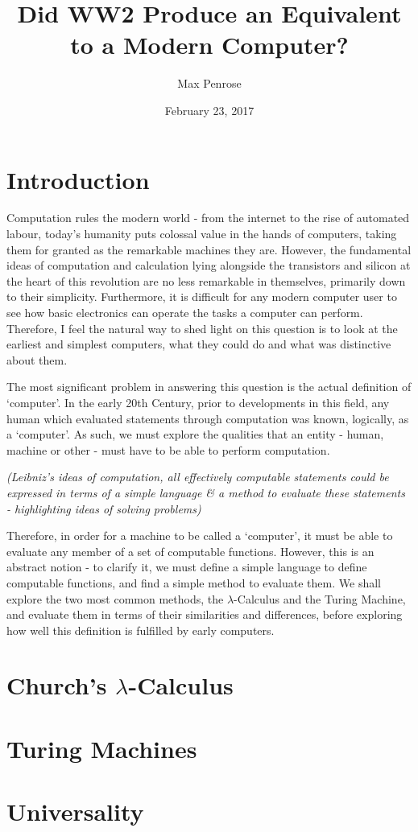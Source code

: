 \documentclass {article}
\title{Did WW2 Produce an Equivalent to a Modern Computer?}
\date{February 23, 2017}
\author{Max Penrose}
\begin{document}
\maketitle
\tableofcontents
\clearpage

\section*{Introduction}
Computation rules the modern world - from the internet to the rise of automated labour, today's humanity puts colossal value in the hands of computers, taking them for granted as the remarkable machines they are. However, the fundamental ideas of computation and calculation lying alongside the transistors and silicon at the heart of this revolution are no less remarkable in themselves, primarily down to their simplicity. Furthermore, it is difficult for any modern computer user to see how basic electronics can operate the tasks a computer can perform. Therefore, I feel the natural way to shed light on this question is to look at the earliest and simplest computers, what they could do and what was distinctive about them.

The most significant problem in answering this question is the actual definition of `computer'. In the early 20th Century, prior to developments in this field, any human which evaluated statements through computation was known, logically, as a `computer'. As such, we must explore the qualities that an entity - human, machine or other - must have to be able to perform computation.

\textit{(Leibniz's ideas of computation, all effectively computable statements could be expressed in terms of a simple language \& a method to evaluate these statements - highlighting ideas of solving problems)}

Therefore, in order for a machine to be called a `computer', it must be able to evaluate any member of a set of computable functions. However, this is an abstract notion - to clarify it, we must define a simple language to define computable functions, and find a simple method to evaluate them. We shall explore the two most common methods, the $\lambda$-Calculus and the Turing Machine, and evaluate them in terms of their similarities and differences, before exploring how well this definition is fulfilled by early computers.



\section{Church's $\lambda$-Calculus}



\section{Turing Machines}



\section{Universality}








\end{document}
